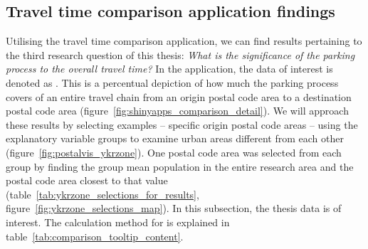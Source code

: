 \newpage
\subsection{Travel time comparison application findings}
\justify

Utilising the travel time comparison application, we can find results pertaining to the third research question of this thesis: \textit{What is the significance of the parking process to the overall travel time?} In the application, the data of interest is denoted as . This is a percentual depiction of how much the parking process covers of an entire travel chain from an origin postal code area to a destination postal code area (figure~\ref{fig:shinyapps_comparison_detail}). We will approach these results by selecting examples -- specific origin postal code areas -- using the explanatory variable  groups to examine urban areas different from each other (figure~\ref{fig:postalvis_ykrzone}). One postal code area was selected from each  group by finding the group mean population in the entire research area and the postal code area closest to that value (table~\ref{tab:ykrzone_selections_for_results}, figure~\ref{fig:ykrzone_selections_map}). In this subsection, the thesis data  is of interest. The calculation method for  is explained in table~\ref{tab:comparison_tooltip_content}.

